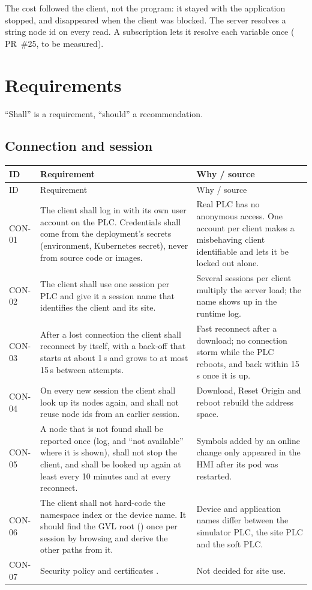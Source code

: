 \documentclass[11pt,a4paper]{article}
\makeatletter
\newenvironment{reqtable}{%
  \begin{small}
  \setlength{\tabcolsep}{4pt}%
  \begin{longtable}{@{}P{14mm}P{86mm}P{60mm}@{}}
  \toprule
  ID & Requirement & Why / source\\
  \midrule
  \endfirsthead
  \toprule
  ID & Requirement & Why / source\\
  \midrule
  \endhead
  \bottomrule
  \endfoot
}{%
  \end{longtable}
  \end{small}
}
\makeatother
\begin{document}
The cost followed the client, not the program: it stayed with the application stopped, and disappeared
when the client was blocked. The server resolves a string node id on every read. A subscription lets it
resolve each variable once ( PR~\#25, to be measured).

\section{Requirements}
\label{sec:req}
``Shall'' is a requirement, ``should'' a recommendation.

\subsection{Connection and session}
\begin{reqtable}
CON-01 & The client shall log in with its own user account on the PLC. Credentials shall come from the
deployment's secrets (environment, Kubernetes secret), never from source code or images. &
Real PLC has no anonymous access. One account per client makes a misbehaving client identifiable and
lets it be locked out alone.\\
CON-02 & The client shall use one session per PLC and give it a session name that identifies the client
and its site. & Several sessions per client multiply the server load; the name shows up in the
runtime log.\\
CON-03 & After a lost connection the client shall reconnect by itself, with a back-off that starts at
about 1\,s and grows to at most 15\,s between attempts. & Fast reconnect after a download; no connection
storm while the PLC reboots, and back within 15\,s once it is up.\\
CON-04 & On every new session the client shall look up its nodes again, and shall not reuse node ids
from an earlier session. & Download, Reset Origin and reboot rebuild the address space.\\
CON-05 & A node that is not found shall be reported once (log, and ``not available'' where it is shown),
shall not stop the client, and shall be looked up again at least every 10 minutes and at every reconnect.
& Symbols added by an online change only appeared in the HMI after its pod was restarted.\\
CON-06 & The client shall not hard-code the namespace index or the device name. It should find the GVL
root () once per session by browsing and derive the other paths from it. & Device and
application names differ between the simulator PLC, the site PLC and the soft PLC.\\
CON-07 & Security policy and certificates . & Not decided for site use.\\
\end{reqtable}
\end{document}
